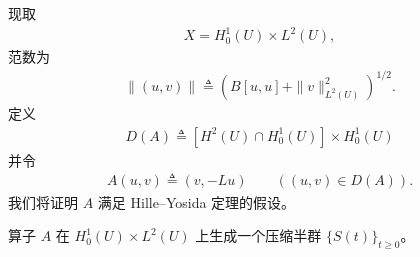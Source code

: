 \documentclass[../../main.tex]{subfiles}
\begin{document}
现取
\begin{align*}
X=H^1_0(U)\times L^2(U),
\end{align*}
范数为
\begin{align}
\|(u,v)\|\triangleq (B[u,u]+\|v\|_{L^2(U)}^2)^{1/2}.\label{align:ch07-4-eq36}
\end{align}
定义
\begin{align*}
D(A)\triangleq [H^2(U)\cap H^1_0(U)]\times H^1_0(U)
\end{align*}
并令
\begin{align}
A(u,v)\triangleq (v,-Lu)\qquad ((u,v)\in D(A)).\label{align:ch07-4-eq37}
\end{align}
我们将证明 $A$ 满足 Hille--Yosida 定理的假设。

\begin{theorem}\label{theorem:ch07-4-双曲型PDE作为半群}算子 $A$ 在 $H^1_0(U)\times L^2(U)$ 上生成一个压缩半群 $\{S(t)\}_{t\geqslant 0}$。
\end{theorem}
\end{document}
